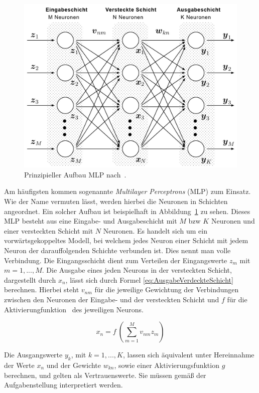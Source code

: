 \documentclass[times, 12pt,twocolumn]{article}
\begin{document}
\begin{figure}
	\flushleft
	\includegraphics[width=\columnwidth]{Bilder/structure-mlp.jpg}
	\caption{Prinzipieller Aufbau MLP nach~\cite{MDPI}.}
	\label{fig:MLP}
\end{figure}

Am häufigsten kommen sogenannte \textit{Multilayer Perceptrons} (MLP)  \cite{NNBraun}\cite{NNNauck}\cite{NNStanley} zum Einsatz. Wie der Name vermuten lässt, werden hierbei die Neuronen in Schichten angeordnet. Ein solcher Aufbau ist beispielhaft in Abbildung~\ref{fig:MLP} zu sehen. Dieses MLP besteht aus eine Eingabe- und Ausgabeschicht mit $M$ bzw $K$ Neuronen und einer versteckten Schicht mit $N$ Neuronen. Es handelt sich um ein vorwärtsgekoppeltes Modell, bei welchem jedes Neuron einer Schicht mit jedem Neuron der darauffolgenden Schichte verbunden ist. Dies nennt man volle Verbindung. Die Eingangsschicht dient zum Verteilen der Eingangswerte $z_m$ mit $m=1,...,M$. Die Ausgabe eines jeden Neurons in der versteckten Schicht, dargestellt durch $x_n$, lässt sich durch Formel \ref{eq:AusgabeVerdeckteSchicht} berechnen. Hierbei steht $v_{nm}$ für die jeweilige Gewichtung der Verbindungen zwischen den Neuronen der Eingabe- und der versteckten Schicht und $f$ für die Aktivierungfunktion~\cite{NNStanley}\cite{NNHaykin} des jeweiligen Neurons. 

\footnotesize
\begin{equation} 
x_n = f~(\sum_{m=1}^M v_{nm}z_m)
	\label{eq:AusgabeVerdeckteSchicht}
\end{equation}
\small

Die Ausgangswerte $y_k$, mit $k=1,...,K$, lassen sich äquivalent unter Hereinnahme der Werte $x_n$ und der Gewichte $w_{kn}$, sowie einer Aktivierungsfunktion $g$ berechnen, und gelten als Vertrauenswerte. Sie müssen gemäß der Aufgabenstellung interpretiert werden. 
\end{document}
